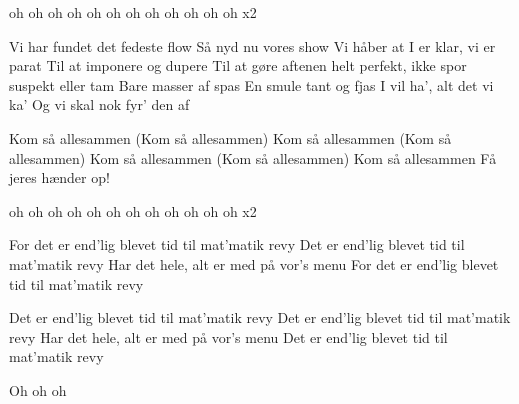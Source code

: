 \documentclass[a4paper,11pt]{article}
\begin{document}
\begin{song}
oh oh oh oh oh oh oh oh oh oh oh oh x2

Vi har fundet det fedeste flow
Så nyd nu vores show
Vi håber at I er klar, vi er parat
Til at imponere og dupere 
Til at gøre aftenen helt perfekt, ikke spor suspekt eller tam
Bare masser af spas
En smule tant og fjas 
I vil ha', alt det vi ka'
Og vi skal nok fyr' den af

Kom så allesammen (Kom så allesammen)
Kom så allesammen (Kom så allesammen)
Kom så allesammen (Kom så allesammen)
Kom så allesammen
Få jeres hænder op!

oh oh oh oh oh oh oh oh oh oh oh oh x2

For det er end'lig blevet tid til mat'matik revy
Det er end'lig blevet tid til mat'matik revy
Har det hele, alt er med på vor's menu
For det er end'lig blevet tid til mat'matik revy

Det er end'lig blevet tid til mat'matik revy
Det er end'lig blevet tid til mat'matik revy
Har det hele, alt er med på vor's menu
Det er end'lig blevet tid til mat'matik revy 

Oh oh oh
\end{song}
\end{document}
